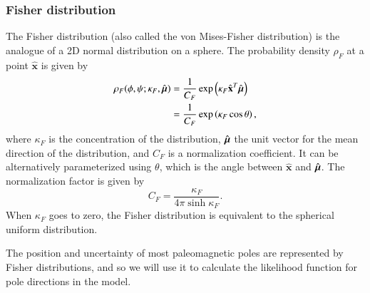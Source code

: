 \documentclass[preprint,12pt,authoryear]{elsarticle}
\newcommand{\mitbf}[1]{\hbox{\mathversion{bold}$#1$}}
\begin{document}
\subsubsection{Fisher distribution}
The Fisher distribution (also called the von Mises-Fisher distribution) is the analogue
of a 2D normal distribution on a sphere.
The probability density $\rho_F$ at a point $\hat{\mathbf{x}}$ is given by
\begin{equation}
  \begin{aligned}
  \rho_F(\phi, \psi ; \kappa_F, \hat{\mitbf{\mu}}) 
  &= \frac{1}{C_F} \exp \left( \kappa_F \hat{\mathbf{x}}^T \hat{\mitbf{\mu}} \right) \\
  &= \frac{1}{C_F} \exp \left( \kappa_F \cos \theta \right),
  \end{aligned}
\end{equation}
where $\kappa_F$ is the concentration of the distribution, 
$\hat{\mitbf{\mu}}$ the unit vector for the mean direction of the distribution, 
and $C_F$ is a normalization coefficient. It can be alternatively
parameterized using $\theta$, which is the angle between $\hat{\mathbf{x}}$ and $\hat{\mitbf{\mu}}$.
The normalization factor is given by 
\begin{equation}
  C_F = \frac{\kappa_F}{4 \pi \sinh{\kappa_F}}.
\end{equation}
When $\kappa_F$ goes to zero, the Fisher distribution is equivalent to the spherical uniform distribution.

The position and uncertainty of most paleomagnetic poles are represented by Fisher distributions,
and so we will use it to calculate the likelihood function for pole directions in the model.
\end{document}
